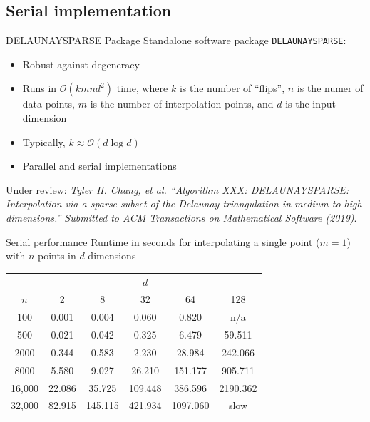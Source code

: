 \documentclass[xcolor=dvipsnames]{beamer}
\begin{document}
\subsection{Serial implementation}
\begin{frame}{DELAUNAYSPARSE Package}
Standalone software package {\tt DELAUNAYSPARSE}:
\begin{itemize}
\item Robust against degeneracy
\item Runs in $\mathcal{O}(k m n d^2)$ time, where $k$ is the
number of ``flips'', $n$ is the numer of data points, $m$ is the number of
interpolation points, and $d$ is the input dimension
\item Typically, $k \approx \mathcal{O}(d\log d)$
\item Parallel and serial implementations
\end{itemize}
Under review:
{\small \it Tyler H. Chang, et al.
``Algorithm XXX: DELAUNAYSPARSE: Interpolation via a sparse subset of the
Delaunay triangulation in medium to high dimensions.''
Submitted to ACM Transactions on Mathematical Software (2019)}. 
\end{frame}
\begin{frame}{Serial performance}
Runtime in seconds for interpolating a single point ($m=1$) with $n$ points
in $d$ dimensions\\
\bigskip
\medskip
\begin{tabular}{c|ccccc}
& & & $d$ & & \\
$n$ & 2 & 8 & 32 & 64 & 128 \\
\hline
100 & 0.001 & 0.004 & 0.060 & 0.820 & n/a \\
500 & 0.021 & 0.042 & 0.325 & 6.479 & 59.511 \\
2000 & 0.344 & 0.583 & 2.230 & 28.984 & 242.066 \\
8000 & 5.580 & 9.027 & 26.210 & 151.177 & 905.711 \\
16,000 & 22.086 & 35.725 & 109.448  & 386.596  & 2190.362 \\
32,000 & 82.915 & 145.115 & 421.934 & 1097.060 & slow \\
\end{tabular}
\end{frame}
\end{document}
